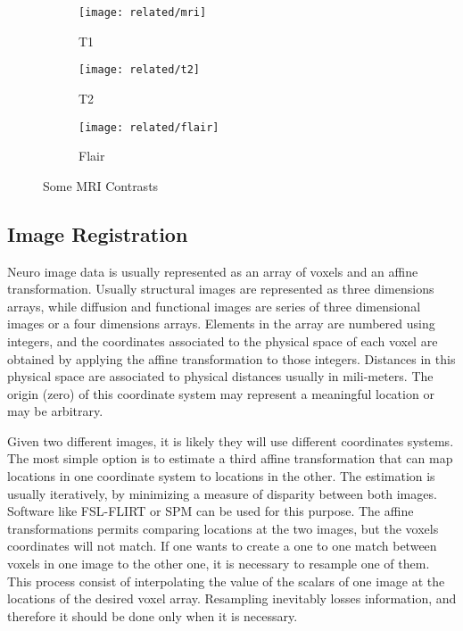 \begin{figure}
    \centering
    \begin{subfigure}{0.3\textwidth}
        \texttt{[image: related/mri]}
				\caption{T1}
    \end{subfigure} \hfill
		\begin{subfigure}{0.3\textwidth}
        \texttt{[image: related/t2]}
				\caption{T2}
    \end{subfigure} \hfill
		    \begin{subfigure}{0.3\textwidth}
        \texttt{[image: related/flair]}
				\caption{Flair}
    \end{subfigure}
    \caption{Some MRI Contrasts}\label{fig_mri_mods}
\end{figure}

 

\subsection{Image Registration}

Neuro image data is usually represented as an array of voxels and an affine transformation. Usually structural images are represented as three dimensions arrays, while diffusion and functional images are series of three dimensional images or a four dimensions arrays. Elements in the array are numbered using integers, and the coordinates associated to the physical space of each voxel are obtained by applying the affine transformation to those integers. Distances in this physical space are associated to physical distances usually in mili-meters. The origin (zero) of this coordinate system may represent a meaningful location or may be arbitrary. 

Given two different images, it is likely they will use different coordinates systems. The most simple option is to estimate a third affine transformation that can map locations in one coordinate system to locations in the other. The estimation is usually iteratively, by minimizing a measure of disparity between both images. Software like FSL-FLIRT \autocite{jenkinson_fsl_2012} or SPM \autocite{friston_statistical_2007} can be used for this purpose. The affine transformations permits comparing locations at the two images, but the voxels coordinates will not match. If one wants to create a one to one match between voxels in one image to the other one, it is necessary to resample one of them. This process consist of interpolating the value of the scalars of one image at the locations of the desired voxel array. Resampling inevitably losses information, and therefore it should be done only when it is necessary.

